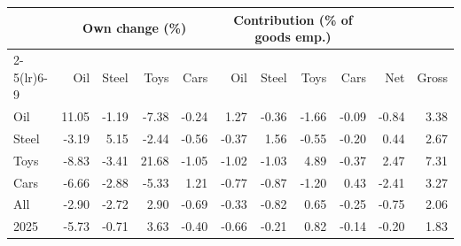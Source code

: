 \begin{tabular}{lrrrrrrrrrr}
\toprule
 & \multicolumn{4}{c}{Own change (\%)} & \multicolumn{4}{c}{Contribution (\% of goods emp.)} & & \\
\cmidrule(lr){2-5}\cmidrule(lr){6-9}
 & Oil & Steel & Toys & Cars & Oil & Steel & Toys & Cars & Net & Gross \\
\midrule
Oil & 11.05 & -1.19 & -7.38 & -0.24 & 1.27 & -0.36 & -1.66 & -0.09 & -0.84 & 3.38 \\
Steel & -3.19 & 5.15 & -2.44 & -0.56 & -0.37 & 1.56 & -0.55 & -0.20 & 0.44 & 2.67 \\
Toys & -8.83 & -3.41 & 21.68 & -1.05 & -1.02 & -1.03 & 4.89 & -0.37 & 2.47 & 7.31 \\
Cars & -6.66 & -2.88 & -5.33 & 1.21 & -0.77 & -0.87 & -1.20 & 0.43 & -2.41 & 3.27 \\
All & -2.90 & -2.72 & 2.90 & -0.69 & -0.33 & -0.82 & 0.65 & -0.25 & -0.75 & 2.06 \\
2025 & -5.73 & -0.71 & 3.63 & -0.40 & -0.66 & -0.21 & 0.82 & -0.14 & -0.20 & 1.83 \\
\bottomrule
\end{tabular}

